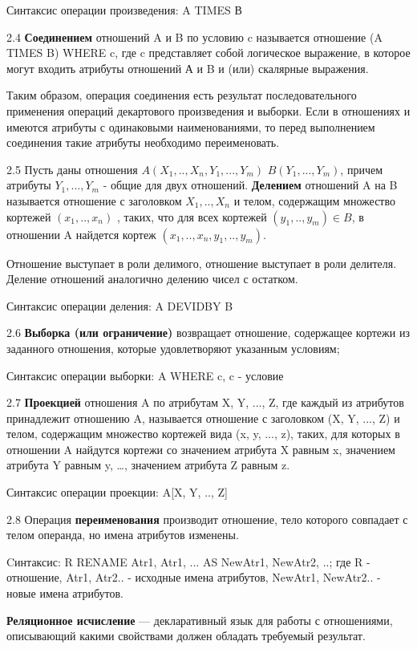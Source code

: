 Синтаксис операции произведения: A TIMES В

2.4 \textbf{Соединением} отношений A и B по условию c называется отношение (A TIMES B) WHERE c, где c представляет собой логическое выражение, в которое могут входить атрибуты отношений А и B и (или) скалярные выражения.

Таким образом, операция соединения есть результат последовательного применения операций декартового произведения и выборки. Если в отношениях  и  имеются атрибуты с одинаковыми наименованиями, то перед выполнением соединения такие атрибуты необходимо переименовать.

2.5 Пусть даны отношения $A(X_1, .., X_n, Y_1, ..., Y_m)$  $B(Y_1, ..., Y_m)$, причем атрибуты $Y_1, ..., Y_m$ - общие для двух отношений. \textbf{Делением} отношений A на B называется отношение с заголовком  $X_1, .., X_n$ и телом, содержащим множество кортежей $(x_1, .., x_n)$ , таких, что для всех кортежей $(y_1, .., y_m) \in B$, в отношении A найдется кортеж $(x_1, .., x_n, y_1, .., y_m)$.

Отношение  выступает в роли делимого, отношение  выступает в роли делителя. Деление отношений аналогично делению чисел с остатком.

Синтаксис операции деления: A DEVIDBY B

2.6 \textbf{Выборка (или ограничение)} возвращает отношение, содержащее кортежи из заданного отношения, которые удовлетворяют указанным условиям;

Синтаксис операции выборки: A WHERE c, c - условие 

2.7 \textbf{Проекцией} отношения A по атрибутам X, Y, ..., Z, где каждый из атрибутов принадлежит отношению A, называется отношение с заголовком (X, Y, ..., Z)  и телом, содержащим множество кортежей вида (x, y, ..., z), таких, для которых в отношении A найдутся кортежи со значением атрибута X равным x, значением атрибута Y равным y, …, значением атрибута Z равным z. 

Синтаксис операции проекции: A[X, Y, .., Z]

2.8 Операция \textbf{переименования} производит отношение, тело которого совпадает с телом операнда, но имена атрибутов изменены. 

Cинтаксис: R RENAME Atr1, Atr1, ... AS NewAtr1, NewAtr2, ..; где R - отношение, Atr1, Atr2.. - исходные имена атрибутов, NewAtr1, NewAtr2.. - новые имена атрибутов.

\textbf{Реляционное исчисление} — декларативный язык для работы с отношениями, описывающий какими свойствами должен обладать требуемый результат.
